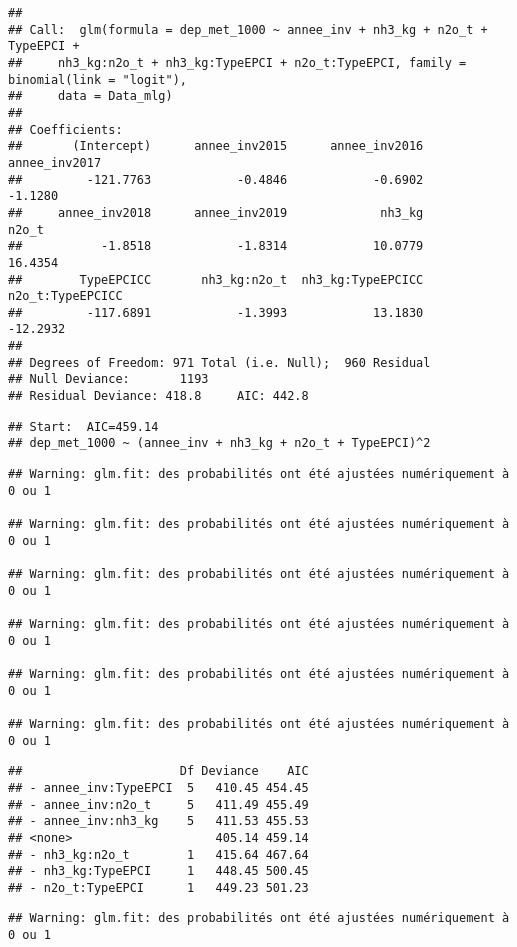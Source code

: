 \documentclass[
]{article}
\begin{document}
\begin{verbatim}
## 
## Call:  glm(formula = dep_met_1000 ~ annee_inv + nh3_kg + n2o_t + TypeEPCI + 
##     nh3_kg:n2o_t + nh3_kg:TypeEPCI + n2o_t:TypeEPCI, family = binomial(link = "logit"), 
##     data = Data_mlg)
## 
## Coefficients:
##       (Intercept)      annee_inv2015      annee_inv2016      annee_inv2017  
##         -121.7763            -0.4846            -0.6902            -1.1280  
##     annee_inv2018      annee_inv2019             nh3_kg              n2o_t  
##           -1.8518            -1.8314            10.0779            16.4354  
##        TypeEPCICC       nh3_kg:n2o_t  nh3_kg:TypeEPCICC   n2o_t:TypeEPCICC  
##         -117.6891            -1.3993            13.1830           -12.2932  
## 
## Degrees of Freedom: 971 Total (i.e. Null);  960 Residual
## Null Deviance:       1193 
## Residual Deviance: 418.8     AIC: 442.8
\end{verbatim}

\begin{verbatim}
## Start:  AIC=459.14
## dep_met_1000 ~ (annee_inv + nh3_kg + n2o_t + TypeEPCI)^2
\end{verbatim}

\begin{verbatim}
## Warning: glm.fit: des probabilités ont été ajustées numériquement à 0 ou 1

## Warning: glm.fit: des probabilités ont été ajustées numériquement à 0 ou 1

## Warning: glm.fit: des probabilités ont été ajustées numériquement à 0 ou 1

## Warning: glm.fit: des probabilités ont été ajustées numériquement à 0 ou 1

## Warning: glm.fit: des probabilités ont été ajustées numériquement à 0 ou 1

## Warning: glm.fit: des probabilités ont été ajustées numériquement à 0 ou 1
\end{verbatim}

\begin{verbatim}
##                      Df Deviance    AIC
## - annee_inv:TypeEPCI  5   410.45 454.45
## - annee_inv:n2o_t     5   411.49 455.49
## - annee_inv:nh3_kg    5   411.53 455.53
## <none>                    405.14 459.14
## - nh3_kg:n2o_t        1   415.64 467.64
## - nh3_kg:TypeEPCI     1   448.45 500.45
## - n2o_t:TypeEPCI      1   449.23 501.23
\end{verbatim}

\begin{verbatim}
## Warning: glm.fit: des probabilités ont été ajustées numériquement à 0 ou 1
\end{verbatim}
\end{document}
